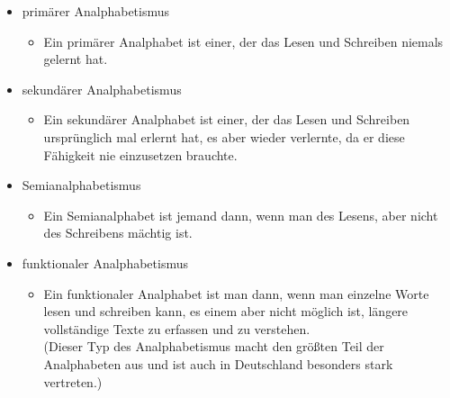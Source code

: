 \begin{itemize}
	\item primärer Analphabetismus
				\begin{itemize}
					  \item Ein primärer Analphabet ist einer, der das Lesen und Schreiben niemals gelernt hat.
				\end{itemize}
	\item sekundärer Analphabetismus
				\begin{itemize}
					  \item Ein sekundärer Analphabet ist einer, der das Lesen und Schreiben ursprünglich mal erlernt hat, es aber wieder verlernte, da er diese Fähigkeit nie einzusetzen brauchte.
				\end{itemize}
	\item Semianalphabetismus
				\begin{itemize}
					  \item Ein Semianalphabet ist jemand dann, wenn man des Lesens, aber nicht des Schreibens mächtig ist.
				\end{itemize}
	\item funktionaler Analphabetismus
				\begin{itemize}
					  \item Ein funktionaler Analphabet ist man dann, wenn man einzelne Worte lesen und schreiben kann, es einem aber nicht möglich ist, längere vollständige Texte zu erfassen und zu verstehen.\\
						(Dieser Typ des Analphabetismus macht den größten Teil der Analphabeten aus und ist auch in Deutschland besonders stark vertreten.)
				\end{itemize}
\end{itemize}